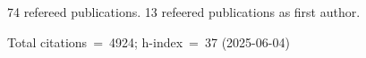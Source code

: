 74 refereed publications. 13 refeered publications as first author.

Total citations~=~4924; h-index~=~37 (2025-06-04)